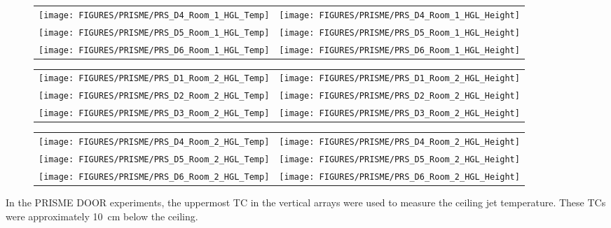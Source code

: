 \begin{figure}[p]
\begin{tabular*}{\textwidth}{l@{\extracolsep{\fill}}r}
\texttt{[image: FIGURES/PRISME/PRS\_D4\_Room\_1\_HGL\_Temp]} &
\texttt{[image: FIGURES/PRISME/PRS\_D4\_Room\_1\_HGL\_Height]} \\
\texttt{[image: FIGURES/PRISME/PRS\_D5\_Room\_1\_HGL\_Temp]} &
\texttt{[image: FIGURES/PRISME/PRS\_D5\_Room\_1\_HGL\_Height]} \\
\texttt{[image: FIGURES/PRISME/PRS\_D6\_Room\_1\_HGL\_Temp]} &
\texttt{[image: FIGURES/PRISME/PRS\_D6\_Room\_1\_HGL\_Height]}
\end{tabular*}
\label{PRISME_HGL_2}
\end{figure}

\begin{figure}[p]
\begin{tabular*}{\textwidth}{l@{\extracolsep{\fill}}r}
\texttt{[image: FIGURES/PRISME/PRS\_D1\_Room\_2\_HGL\_Temp]} &
\texttt{[image: FIGURES/PRISME/PRS\_D1\_Room\_2\_HGL\_Height]} \\
\texttt{[image: FIGURES/PRISME/PRS\_D2\_Room\_2\_HGL\_Temp]} &
\texttt{[image: FIGURES/PRISME/PRS\_D2\_Room\_2\_HGL\_Height]} \\
\texttt{[image: FIGURES/PRISME/PRS\_D3\_Room\_2\_HGL\_Temp]} &
\texttt{[image: FIGURES/PRISME/PRS\_D3\_Room\_2\_HGL\_Height]}
\end{tabular*}
\label{PRISME_HGL_3}
\end{figure}

\begin{figure}[p]
\begin{tabular*}{\textwidth}{l@{\extracolsep{\fill}}r}
\texttt{[image: FIGURES/PRISME/PRS\_D4\_Room\_2\_HGL\_Temp]} &
\texttt{[image: FIGURES/PRISME/PRS\_D4\_Room\_2\_HGL\_Height]} \\
\texttt{[image: FIGURES/PRISME/PRS\_D5\_Room\_2\_HGL\_Temp]} &
\texttt{[image: FIGURES/PRISME/PRS\_D5\_Room\_2\_HGL\_Height]} \\
\texttt{[image: FIGURES/PRISME/PRS\_D6\_Room\_2\_HGL\_Temp]} &
\texttt{[image: FIGURES/PRISME/PRS\_D6\_Room\_2\_HGL\_Height]}
\end{tabular*}
\label{PRISME_HGL_4}
\end{figure}

\clearpage

In the PRISME DOOR experiments, the uppermost TC in the vertical arrays were used to measure the ceiling jet temperature. These TCs were approximately 10~cm below the ceiling.

